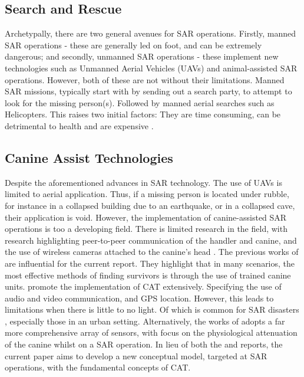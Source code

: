 \documentclass{ueacmpstyle}
\begin{document}
    \subsection{Search and Rescue}
    Archetypally, there are two general avenues for SAR operations. Firstly, manned SAR operations - these are generally led on foot, and can be extremely dangerous; and secondly, unmanned SAR operations - these implement new technologies such as Unmanned Aerial Vehicles (UAVs) and animal-assisted SAR operations. However, both of these are not without their limitations. Manned SAR missions, typically start with by sending out a search party, to attempt to look for the missing person(s). Followed by manned aerial searches such as Helicopters. This raises two initial factors: They are time consuming, can be detrimental to health \citep{McRae2019} and are expensive \citep{Shakhatreh2019}. 
    
    \subsection{Canine Assist Technologies}
    Despite the aforementioned advances in SAR technology. The use of UAVs is limited to aerial application. Thus, if a missing person is located under rubble, for instance in a collapsed building due to an earthquake, or in a collapsed cave, their application is void. However, the implementation of canine-assisted SAR operations is too a developing field. There is limited research in the field, with research highlighting peer-to-peer communication of the handler and canine, and the use of wireless cameras attached to the canine's head \citep{Ferworn2006}. The previous works of \cite{Ferworn2006} are influential for the current report. They highlight that in many scenarios, the most effective methods of finding survivors is through the use of trained canine units. \cite{Ferworn2006} promote the implementation of CAT extensively. Specifying the use of audio and video communication, and GPS location. However, this leads to limitations when there is little to no light. Of which is common for SAR disasters \citep{Statheropoulos2014}, especially those in an urban setting. Alternatively, the works of \cite{Bozkurt2014} adopts a far more comprehensive array of sensors, with focus on the physiological attenuation of the canine whilst on a SAR operation. In lieu of both the \cite{Ferworn2006} and \cite{Bozkurt2014} reports, the current paper aims to develop a new conceptual model, targeted at SAR operations, with the fundamental concepts of CAT. 
    
\end{document}
